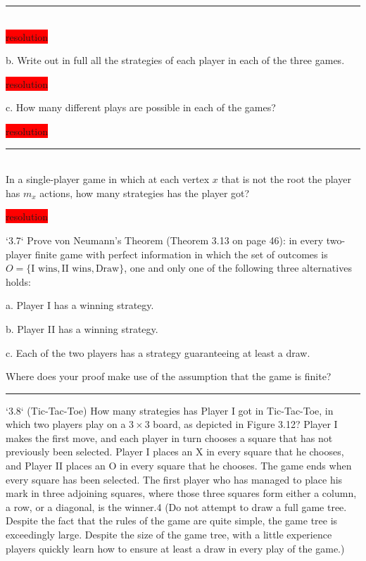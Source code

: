 \documentclass[10pt]{report}
\newenvironment{exercise}[1]
    {\vspace{0.5cm}\hrule\vspace{0.5cm}\noindent\fbox{#1}\\}
    {\vspace{0.5cm}}
\newenvironment{response}
{\vspace{0.2cm}\noindent\colorbox{red}{resolution}}
    {\vspace{0.5cm}}
\begin{document}
\begin{exercise}{3.5}
\begin{response}
	\end{response}

	b. Write out in full all the strategies of each player in each of the three games.

	\begin{response}
	\end{response}

	c. How many different plays are possible in each of the games?

	\begin{response}
	\end{response}

\end{exercise}

\begin{exercise}{3.6}
	In a single-player game in which at each vertex $x$ that is not the root the player has $m_x$ actions, how many strategies has the player got?

	\begin{response}
	\end{response}
\end{exercise}

`3.7` Prove von Neumann’s Theorem (Theorem 3.13 on page 46): in every two-player finite game with perfect information in which the set of outcomes is $O = \{\text{I wins}, \text{II wins}, \text{Draw}\}$, one and only one of the following three alternatives holds:

a. Player I has a winning strategy.

b. Player II has a winning strategy.

c. Each of the two players has a strategy guaranteeing at least a draw.

Where does your proof make use of the assumption that the game is finite?

\vspace{0.5cm}
\hrule
\vspace{0.5cm}
`3.8` (Tic-Tac-Toe) How many strategies has Player I got in Tic-Tac-Toe, in which two players play on a $3\times 3$ board, as depicted in Figure 3.12? Player I makes the first move, and each player in turn chooses a square that has not previously been selected. Player I places an X in every square that he chooses, and Player II places an O in every square that he chooses. The game ends when every square has been selected. The first player who has managed to place his mark in three adjoining squares, where those three squares form either a column, a row, or a diagonal, is the winner.4 (Do not attempt to draw a full game tree. Despite the fact that the rules of the game are quite simple, the game tree is exceedingly large. Despite the size of the game tree, with a little experience players quickly learn how to ensure at least a draw in every play of the game.)
\end{document}
